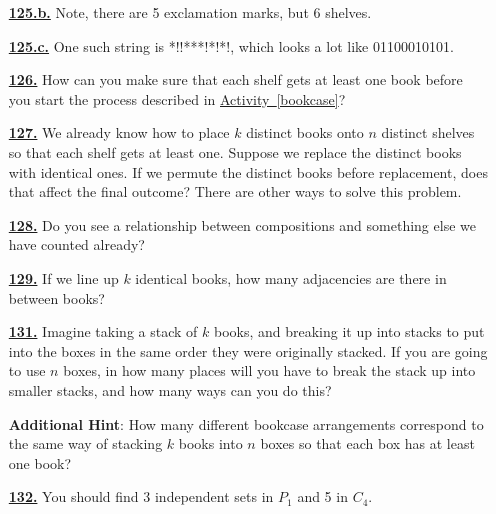 \documentclass[10pt,]{book}
\theoremstyle{plain}
\theoremstyle{definition}
\theoremstyle{definition}
\theoremstyle{definition}
\numberwithin{equation}{chapter}
\begin{document}
\begin{itemize}[itemsep=1em]
\hypertarget{a-125.b}{}\item[\textbf{\hyperref[task-170]{125.b.}}]
\hypertarget{p-848}{}%
Note, there are 5 exclamation marks, but 6 shelves.%

\hypertarget{a-125.c}{}\item[\textbf{\hyperref[task-171]{125.c.}}]
\hypertarget{p-850}{}%
One such string is *!!***!*!*!, which looks a lot like 01100010101.%

\hypertarget{a-126}{}\item[\textbf{\hyperref[bookcaseeveryshelf]{126.}}]
\hypertarget{p-859}{}%
How can you make sure that each shelf gets at least one book before you start the process described in \hyperref[bookcase]{Activity~\ref{bookcase}}?%

\hypertarget{a-127}{}\item[\textbf{\hyperref[activity-120]{127.}}]
\hypertarget{p-863}{}%
We already know how to place \(k\) distinct books onto \(n\) distinct shelves so that each shelf gets at least one. Suppose we replace the distinct books with identical ones. If we permute the distinct books before replacement, does that affect the final outcome? There are other ways to solve this problem.%

\hypertarget{a-128}{}\item[\textbf{\hyperref[compositionagian]{128.}}]
\hypertarget{p-866}{}%
Do you see a relationship between compositions and something else we have counted already?%

\hypertarget{a-129}{}\item[\textbf{\hyperref[activity-122]{129.}}]
\hypertarget{p-869}{}%
If we line up \(k\) identical books, how many adjacencies are there in between books?%

\hypertarget{a-131}{}\item[\textbf{\hyperref[brokenpermutation]{131.}}]
\hypertarget{p-876}{}%
Imagine taking a stack of \(k\) books, and breaking it up into stacks to put into the boxes in the same order they were originally stacked. If you are going to use \(n\) boxes, in how many places will you have to break the stack up into smaller stacks, and how many ways can you do this?%

\par\smallskip
\noindent\textbf{Additional Hint}: \hypertarget{p-877}{}%
How many different bookcase arrangements correspond to the same way of stacking \(k\) books into \(n\) boxes so that each box has at least one book?%

\hypertarget{a-132}{}\item[\textbf{\hyperref[activity-125]{132.}}]
\hypertarget{p-888}{}%
You should find 3 independent sets in \(P_1\) and 5 in \(C_4\).%


\end{itemize}
\end{document}
